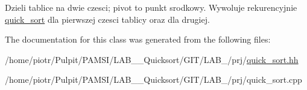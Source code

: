 \-Dzieli tablice na dwie czesci; pivot to punkt srodkowy. \-Wywoluje rekurencyjnie \hyperlink{classquick__sort}{quick\-\_\-sort} dla pierwszej czesci tablicy oraz dla drugiej. 

\-The documentation for this class was generated from the following files\-:\begin{DoxyCompactItemize}
\item 
/home/piotr/\-Pulpit/\-P\-A\-M\-S\-I/\-L\-A\-B\-\_\-\_\-\-Quicksort/\-G\-I\-T/\-L\-A\-B\-\_/prj/\hyperlink{quick__sort_8hh}{quick\-\_\-sort.\-hh}\item 
/home/piotr/\-Pulpit/\-P\-A\-M\-S\-I/\-L\-A\-B\-\_\-\_\-\-Quicksort/\-G\-I\-T/\-L\-A\-B\-\_/prj/quick\-\_\-sort.\-cpp\end{DoxyCompactItemize}
